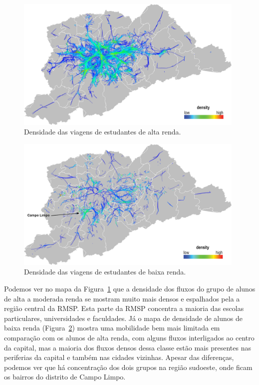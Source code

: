 \begin{figure}[!htb]
  \centering
  \captionsetup{justification=centering}
  \includegraphics[width=0.98\textwidth]{../figuras/high-income-density-leg.png}
  \caption{Densidade das viagens de estudantes de alta renda. \label{fig:students-high}}
\end{figure}
\vspace*{\floatsep}
\begin{figure}[!htb]
  \centering
  \captionsetup{justification=centering}
  \includegraphics[width=0.98\textwidth]{../figuras/low-income-density-leg.png}
  \caption{Densidade das viagens de estudantes de baixa renda. \label{fig:students-low}}
\end{figure}

Podemos ver no mapa da Figura~\ref{fig:students-high} que a densidade dos fluxos
do grupo de alunos de alta a moderada renda se mostram muito mais densos e
espalhados pela a região central da RMSP. Esta parte da RMSP concentra a maioria
das escolas particulares, universidades e faculdades. Já o mapa de densidade de
alunos de baixa renda (Figura~\ref{fig:students-low}) mostra uma mobilidade bem
mais limitada em comparação com os alunos de alta renda, com alguns fluxos
interligados ao centro da capital, mas a maioria dos fluxos densos dessa classe
estão mais presentes nas periferias da capital e também nas cidades vizinhas.
Apesar das diferenças, podemos ver que há concentração dos dois grupos na região
sudoeste, onde ficam os bairros do distrito de Campo Limpo.

